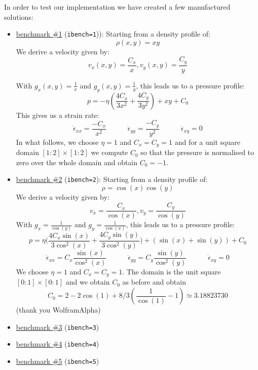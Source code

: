 \newpage
In order to test our implementation we have created a few manufactured solutions:
\begin{itemize}
\item \underline{benchmark \#1} ({\tt ibench=1})): Starting from a density profile of:
\begin{equation}
    \rho(x,y) = xy
\end{equation}
We derive a velocity given by:
\begin{equation}
    v_x(x,y) = \frac{C_x}{x} , v_y(x,y) = \frac{C_y}{y}
\end{equation}

With $g_x(x,y) = \frac{1}{x}$ and $g_y(x,y) = \frac{1}{y}$, this leads us to a pressure profile:
\begin{equation}
    p = - \eta \left( \frac{4C_x}{3x^2} + \frac{4C_y}{3y^2} \right)  + xy + C_0
\end{equation}
This gives us a strain rate:
\[
\dot{\epsilon}_{xx} =  \frac{-C_x}{x^2}
\quad
\quad
\quad
\dot{\epsilon}_{yy} =  \frac{-C_y}{y^2}
\quad
\quad
\quad
\dot{\epsilon}_{xy} = 0 
\]
In what follows, we choose $\eta=1$ and $C_x=C_y=1$ and for a unit square domain $
[1:2]\times[1:2]$ we compute $C_0$
so that the pressure is normalised to zero over the whole domain and obtain $C_0=-1$. 
 
\item \underline{benchmark \#2} ({\tt ibench=2}): Starting from a density profile of:
\begin{equation}
    \rho = \cos(x)\cos(y)
\end{equation}
We derive a velocity given by:
\begin{equation}
    v_x = \frac{C_x}{\cos(x)} , v_y = \frac{C_y}{\cos(y)}
\end{equation}
With $g_x = \frac{1}{\cos(y)}$ and $g_y = \frac{1}{\cos(x)}$, this leads us to a pressure profile:
\begin{equation}
    p =  \eta \Bigg(\frac{4C_x \sin(x)}{3\cos^2(x)} + \frac{4C_y \sin(y)}{3\cos^2(y)}\Bigg) 
    +( \sin(x) + \sin(y) ) + C_0
\end{equation}
\[
\dot{\epsilon}_{xx} = C_x \frac{\sin(x)}{\cos^2(x)}
\quad
\quad
\quad
\dot{\epsilon}_{yy} = C_y \frac{\sin(y)}{\cos^2(y)}
\quad
\quad
\quad
\dot{\epsilon}_{xy} = 0 
\]
We choose $\eta=1$ and $C_x=C_y=1$. The domain is the unit square $[0:1]\times[0:1]$ and we obtain 
$C_0$ as before and obtain 
\[
C_0 = 2 - 2 \cos(1) + 8/3 (\frac{1}{\cos (1)} - 1)
\simeq 3.18823730
\]
(thank you WolframAlpha)


\item \underline{benchmark \#3} ({\tt ibench=3}) 
\item \underline{benchmark \#4} ({\tt ibench=4}) 
\item \underline{benchmark \#5} ({\tt ibench=5}) 
\end{itemize}




